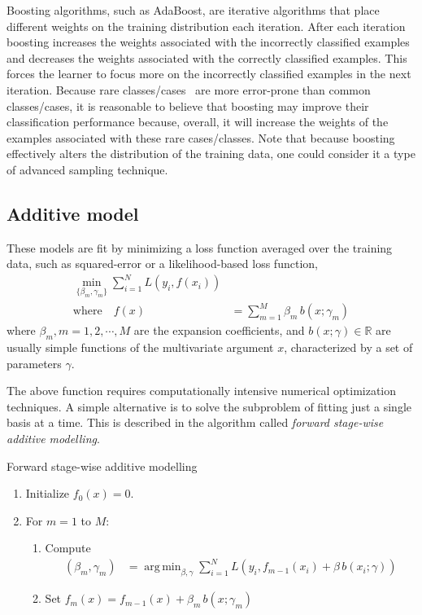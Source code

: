 \documentclass{book}
\DeclareMathOperator*{\argmin}{arg\,min}
\begin{document}
Boosting algorithms, such as AdaBoost, are iterative algorithms that place different weights on the training distribution each iteration. After each iteration boosting increases the weights associated with the incorrectly classified examples and decreases the weights associated with the correctly classified examples. This forces the learner to focus more on the incorrectly classified examples in the next iteration. Because rare classes/cases~\cite{DBLP:journals/sigkdd/Weiss04} are more error-prone than common classes/cases, it is reasonable to believe that boosting may improve their classification performance because, overall, it will increase the weights of the examples associated with these rare cases/classes. Note that because boosting effectively alters the distribution of the training data, one could consider it a type of advanced sampling technique.

\subsection{Additive model}
These models are fit by minimizing a loss function averaged over the training data, such as squared-error or a likelihood-based loss function,
\begin{align*}
\min_{\{\beta_m,\gamma_m\}} \sum_{i=1}^{N} L(y_i, f(x_i)) & \\
\mbox{where} \quad f(x) &= \sum_{m=1}^{M} \beta_m \, b(x;\gamma_m)
\end{align*}
where $\beta_m, m=1,2,\cdots,M$ are the expansion coefficients, and $b(x;\gamma) \in \mathbb{R}$ are usually simple functions of the multivariate argument $x$, characterized  by a set of parameters $\gamma$.  

The above function requires computationally intensive numerical optimization techniques. A simple alternative is to solve the subproblem of fitting just a single basis at a time. This is described in the algorithm called  \emph{forward stage-wise additive modelling}.
\begin{algorithm}[h]
\caption{Forward stage-wise additive modelling}
\begin{enumerate}
\item Initialize $f_0(x) = 0$.
\item For $m = 1$ to $M$:
	\begin{enumerate}
	\item Compute
		\begin{align*}
		(\beta_m,\gamma_m) &= \argmin_{\beta,\gamma} \sum_{i=1}^{N} L(y_i, f_{m-1}(x_i) + \beta \, b(x_i;\gamma))
		\end{align*}
	\item Set $f_m(x) = f_{m-1}(x) + \beta_m \, b(x;\gamma_m)$
	\end{enumerate}
\end{enumerate}
\end{algorithm}
\end{document}
